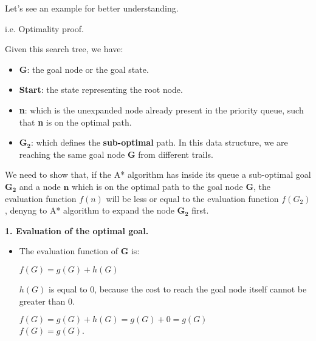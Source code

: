 Let's see an example for better understanding.
\begin{example}
    i.e. Optimality proof. \vspace{3.5pt}
    \begin{center}
    \end{center} \vspace{3.5pt}

    Given this search tree, we have:
    \begin{itemize}
        \renewcommand{\labelitemi}{-}
        \item \textbf{G}: the goal node or the goal state.
        \item \textbf{Start}: the state representing the root node.
        \item \textbf{n}: which is the unexpanded node already present in the priority queue, such that \textbf{n} is on the optimal path.
        \item \textbf{$\mathbf{G_2}$}: which defines the \textbf{sub-optimal} path. In this data structure, we are reaching the same goal node \textbf{G} from different trails.
    \end{itemize} \vspace{7pt}

    We need to show that, if the A* algorithm has inside its queue a sub-optimal goal $\mathbf{G_2}$ and a node $\mathbf{n}$ which is on the optimal path to the goal node 
    $\mathbf{G}$, the evaluation function $f(n)$ will be less or equal to the evaluation function $f(G_2)$, denyng to A* algorithm to expand the node $\mathbf{G_2}$ first. \vspace{3.5pt}

    \textbf{1. Evaluation of the optimal goal.} 
    \begin{itemize}
        \renewcommand{\labelitemi}{}
        \item \vspace{3.5pt}
        The evaluation function of \textbf{G} is: \vspace{3.5pt}
        \begin{center}
            $f(G) = g(G) + h(G)$
        \end{center} \vspace{3.5pt}

        $h(G)$ is equal to $0$, because the cost to reach the goal node itself cannot be greater than $0$. \vspace{3.5pt}
        \begin{center}
            $f(G) = g(G) + h(G) = g(G) + 0 = g(G)$ \\
            $f(G) = g(G)$.
        \end{center}
    \end{itemize}


\end{example}
